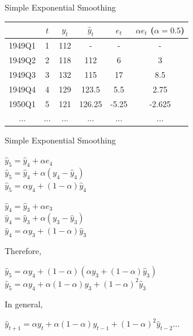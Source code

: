 \documentclass{beamer}\usepackage[]{graphicx}\usepackage[]{color}
\begin{document}
\begin{darkframes}
\begin{frame}[fragile]{Simple Exponential Smoothing}
\begin{center}
          \begin{tabular}{cccccc}
          \hline
             &  $t$ & $y_t$ & $\hat{y}_t$ & $e_t$ & $\alpha e_t$ ($\alpha=0.5$) \\
          \hline
          1949Q1	&	1	&	112	&	-	&	-	&	-           \\
          1949Q2	&	2	&	118	&	112	&	6	&	3         \\
          1949Q3	&	3	&	132	&	115	&	17	&	8.5     \\
          1949Q4	&	4	&	129	&	123.5	&	5.5	&	2.75  \\   
          1950Q1	&	5	&	121	&	126.25	&	-5.25	&	-2.625  \\
          ...	&	...	&	...	&	...	&	...	&	... \\
            \hline 
        \end{tabular}
      \end{center}
    
    \end{frame}
    
    
    
    \begin{frame}[fragile]{Simple Exponential Smoothing}
     \fontsize{9}{9}\selectfont
      \begin{center}
          $ \hat{y}_5 = \hat{y}_4 + \alpha e_4 $ \\ 
          $ \hat{y}_5 = \hat{y}_4 + \alpha (y_4 - \hat{y}_4) $ \\  
          $ \hat{y}_5 = \alpha y_4 + (1-\alpha) \hat{y}_4 $ \\  \bigskip
          
          $ \hat{y}_4 = \hat{y}_3 + \alpha e_3 $ \\ 
          $ \hat{y}_4 = \hat{y}_3 + \alpha (y_3 - \hat{y}_3) $ \\  
          $ \hat{y}_4 = \alpha y_3 + (1-\alpha) \hat{y}_3 $ \\  \bigskip
          
          Therefore,
          
          $ \hat{y}_5 = \alpha y_4 + (1-\alpha) (\alpha y_3 + (1-\alpha) \hat{y}_3) $ \\
          $ \hat{y}_5 = \alpha y_4 + \alpha (1-\alpha)y_3 + (1-\alpha)^2 \hat{y}_3 $ \\ \bigskip
          
          In general,
          
          $ \hat{y}_{t+1} = \alpha y_t + \alpha (1-\alpha)y_{t-1} + (1-\alpha)^2 \hat{y}_{t-2} \ldots$ \\ 
          

\end{center}
\end{frame}
\end{darkframes}
\end{document}
